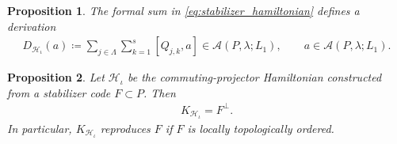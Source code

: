 \documentclass[10pt,a4paper]{amsart}
\newtheorem{proposition}{Proposition}
\def\CA{{\mathcal A}}
\def\CH {{\mathcal H}}
\def\La{{\Lambda}}
\def\l{{\lambda}}
\begin{document}
\begin{proposition}\label{prop:derivation}
The formal sum in \eqref{eq:stabilizer_hamiltonian} defines a derivation
\begin{align}\label{eq:derivation}
    D_{\CH_{\iota}}(a)
    \coloneqq
    \sum_{j\in\La}\sum_{k=1}^{s}[Q_{j,k},a]
    \in\CA(P,\l;L_1),
    \qquad
    a\in\CA(P,\l;L_1).
\end{align}
\end{proposition}

\begin{proposition}\label{prop:recover_code_from_hamiltonian}
Let $\CH_{\iota}$ be the commuting-projector Hamiltonian constructed from a
stabilizer code $F\subset P$. Then
\begin{align}\label{eq:hamiltonian_centralizer_equals_orthogonal}
    K_{\CH_{\iota}}=F^{\perp}.
\end{align}
In particular, $K_{\CH_{\iota}}$ reproduces $F$ if $F$ is locally topologically ordered.
\end{proposition}
\end{document}
